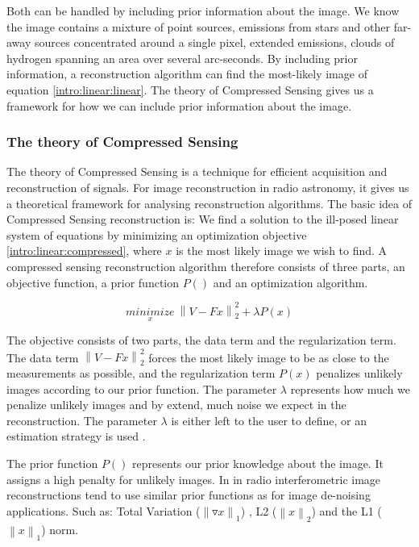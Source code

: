Both can be handled by including prior information about the image. We know the image contains a mixture of point sources, emissions from stars and other far-away sources concentrated around a single pixel, extended emissions, clouds of hydrogen spanning an area over several arc-seconds. By including prior information, a reconstruction algorithm can find the most-likely image of equation \eqref{intro:linear:linear}. The theory of Compressed Sensing\cite{candes2006robust,donoho2006compressed} gives us a framework for how we can include prior information about the image. 

\subsubsection{The theory of Compressed Sensing}
The theory of Compressed Sensing is a technique for efficient acquisition and reconstruction of signals. For image reconstruction in radio astronomy, it gives us a theoretical framework for analysing reconstruction algorithms. The basic idea of Compressed Sensing reconstruction is: We find a solution to the ill-posed linear system of equations by minimizing an optimization objective \eqref{intro:linear:compressed}, where $x$ is the most likely image we wish to find. A compressed sensing reconstruction algorithm therefore consists of three parts, an objective function, a prior function $P()$ and an optimization algorithm.

\begin{equation}\label{intro:linear:compressed}
\underset{x}{minimize} \: \left \| V - Fx \right \|_2^2 + \lambda P(x)
\end{equation}

The objective consists of two parts, the data term and the regularization term. The data term $\left \| V - Fx \right \|_2^2$ forces the most likely image to be as close to the measurements as possible, and the regularization term $P(x)$ penalizes unlikely images according to our prior function. The parameter $\lambda$ represents how much we penalize unlikely images and by extend, much noise we expect in the reconstruction. The parameter $\lambda$ is either left to the user to define, or an estimation strategy is used \cite{miller1970least}.

The prior function $P()$ represents our prior knowledge about the image. It assigns a high penalty for unlikely images. In in radio interferometric image reconstructions tend to use similar prior functions as for image de-noising applications. Such as: Total Variation ($\left \| \triangledown x \right \|_1$) \cite{wiaux2009compressed}, L2 ($\left \|x \right \|_2$) \cite{ferrari2014distributed} and the L1 ($\left \|x \right \|_1$) \cite{hardy2013direct} norm. 

